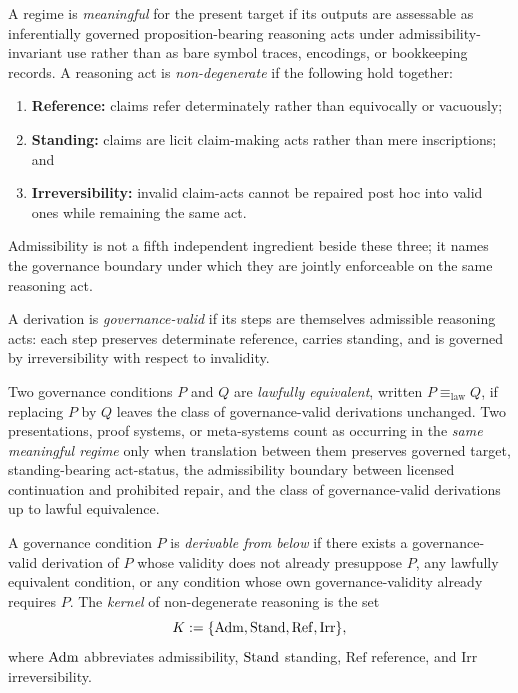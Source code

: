 \begin{definition}
A regime is \emph{meaningful} for the present target if its outputs are assessable as inferentially governed proposition-bearing reasoning acts under admissibility-invariant use rather than as bare symbol traces, encodings, or bookkeeping records. A reasoning act is \emph{non-degenerate} if the following hold together:
\begin{enumerate}[label=(\roman*), leftmargin=2.5em]
    \item \textbf{Reference:} claims refer determinately rather than equivocally or vacuously;
    \item \textbf{Standing:} claims are licit claim-making acts rather than mere inscriptions; and
    \item \textbf{Irreversibility:} invalid claim-acts cannot be repaired post hoc into valid ones while remaining the same act.
\end{enumerate}
Admissibility is not a fifth independent ingredient beside these three; it names the governance boundary under which they are jointly enforceable on the same reasoning act.
\end{definition}

\begin{definition}
A derivation is \emph{governance-valid} if its steps are themselves admissible reasoning acts: each step preserves determinate reference, carries standing, and is governed by irreversibility with respect to invalidity.
\end{definition}

\begin{definition}
Two governance conditions $P$ and $Q$ are \emph{lawfully equivalent}, written $P\equiv_{\mathrm{law}} Q$, if replacing $P$ by $Q$ leaves the class of governance-valid derivations unchanged. Two presentations, proof systems, or meta-systems count as occurring in the \emph{same meaningful regime} only when translation between them preserves governed target, standing-bearing act-status, the admissibility boundary between licensed continuation and prohibited repair, and the class of governance-valid derivations up to lawful equivalence.
\end{definition}

\begin{definition}
A governance condition $P$ is \emph{derivable from below} if there exists a governance-valid derivation of $P$ whose validity does not already presuppose $P$, any lawfully equivalent condition, or any condition whose own governance-validity already requires $P$. The \emph{kernel} of non-degenerate reasoning is the set
\[
K:=\{\mathrm{Adm},\mathrm{Stand},\mathrm{Ref},\mathrm{Irr}\},
\]
where $\mathrm{Adm}$ abbreviates admissibility, $\mathrm{Stand}$ standing, $\mathrm{Ref}$ reference, and $\mathrm{Irr}$ irreversibility.
\end{definition}


